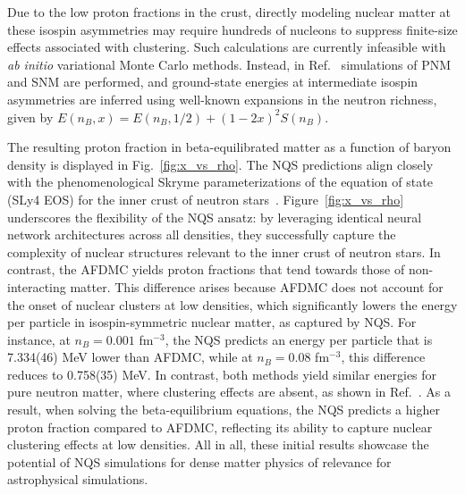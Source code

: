 Due to the low proton fractions in the crust, directly modeling nuclear matter at these isospin asymmetries may require hundreds of nucleons to suppress finite-size effects associated with clustering. Such calculations are currently infeasible with \emph{ab initio} variational Monte Carlo methods. Instead, in Ref.~\cite{fore_investigating_2024} simulations of PNM and SNM are performed, and ground-state energies at intermediate isospin asymmetries are inferred using well-known expansions in the neutron richness, given by $E(n_B,x)=E(n_B, 1/2)+(1-2x)^2 S(n_B)$.





The resulting proton fraction in beta-equilibrated matter as a function of baryon density is displayed in Fig.~\ref{fig:x_vs_rho}. The NQS predictions align closely with the phenomenological Skryme parameterizations of the equation of state (SLy4 EOS) for the inner crust of neutron stars~\cite{douchin2001,chabanat1998}. Figure~\ref{fig:x_vs_rho} underscores the flexibility of the NQS ansatz: by leveraging identical neural network architectures across all densities, they successfully capture the complexity of nuclear structures relevant to the inner crust of neutron stars. In contrast, the AFDMC yields proton fractions that tend towards those of non-interacting matter. This difference arises because AFDMC does not account for the onset of nuclear clusters at low densities, which significantly lowers the energy per particle in isospin-symmetric nuclear matter, as captured by NQS. For instance, at $n_B=0.001$ fm$^{-3}$, the NQS predicts an energy per particle that is 7.334(46) MeV lower than AFDMC, while at $n_B=0.08$ fm$^{-3}$, this difference reduces to 0.758(35) MeV.
In contrast, both methods yield similar energies for pure neutron matter, where clustering effects are absent, as shown in Ref.~\cite{fore2023}. As a result, when solving the beta-equilibrium equations, the NQS predicts a higher proton fraction compared to AFDMC, reflecting its ability to capture nuclear clustering effects at low densities. All in all, these initial results showcase the potential of NQS simulations for dense matter physics of relevance for astrophysical simulations.

